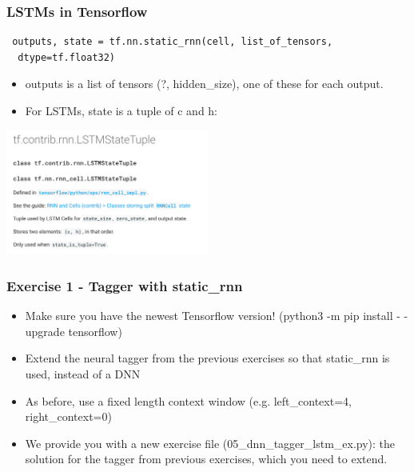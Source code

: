 \documentclass{beamer}
\begin{document}
\begin{frame}[fragile]
 \frametitle{LSTMs in Tensorflow}
\begin{footnotesize}
\begin{lstlisting}
 outputs, state = tf.nn.static_rnn(cell, list_of_tensors,
  dtype=tf.float32)
\end{lstlisting}   
\end{footnotesize}   

 \begin{itemize}
  	\item outputs is a list of tensors (?, hidden\_size), one of these for each output.
  	\item For LSTMs, state is a tuple of c and h:
 \end{itemize}
			
\begin{center}
	\includegraphics[width=0.5\textwidth]{05_lstmtuple}
\end{center}
\end{frame}			

\begin{frame}[fragile]
\frametitle{Exercise 1 - Tagger with static\_rnn}
  \begin{itemize}
  \item Make sure you have the newest Tensorflow version! (python3 -m pip install - -upgrade tensorflow)
  	\item Extend the neural tagger from the previous exercises so that static\_rnn is used, instead of a DNN
  	\item As before, use a fixed length context window (e.g. left\_context=4, right\_context=0)
  	\item We provide you with a new exercise file (05\_dnn\_tagger\_lstm\_ex.py): the solution for the tagger from previous exercises, which you need to extend.
  \end{itemize}
\end{frame}
\end{document}
